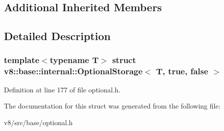 \subsection*{Additional Inherited Members}


\subsection{Detailed Description}
\subsubsection*{template$<$typename T$>$\newline
struct v8\+::base\+::internal\+::\+Optional\+Storage$<$ T, true, false $>$}



Definition at line 177 of file optional.\+h.



The documentation for this struct was generated from the following file\+:\begin{DoxyCompactItemize}
\item 
v8/src/base/optional.\+h\end{DoxyCompactItemize}
